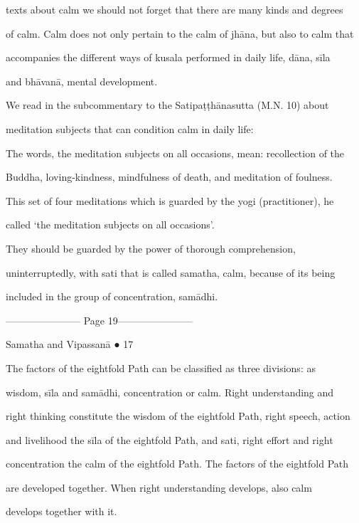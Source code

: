 texts about calm we should not forget that there are many kinds and degrees  

of calm. Calm does not only pertain to the calm of jhāna, but also to calm that  

accompanies  the  different ways  of  kusala  performed  in  daily  life,  dāna,  sīla  

and bhāvanā, mental development. 

   We  read  in  the  subcommentary  to  the  Satipaṭṭhānasutta  (M.N.  10)  about  

meditation subjects that can condition calm in daily life: 



      The words, the meditation subjects on all occasions, mean: recollection of the  

      Buddha, loving-kindness, mindfulness of death, and meditation of foulness. 

         This set of four meditations which is guarded by the yogi (practitioner), he  

      called ‘the meditation subjects on all occasions’. 

         They should be guarded by the power of thorough comprehension,  

      uninterruptedly, with sati that is called samatha, calm, because of its being  

      included in the group of concentration, samādhi. 


----------------------- Page 19-----------------------

                                                               Samatha and Vipassanā ● 17 



The   factors   of   the   eightfold   Path   can   be   classified   as   three   divisions:   as  

wisdom,   sīla  and  samādhi,  concentration  or  calm.  Right  understanding  and  

right thinking constitute the wisdom of the eightfold Path, right speech, action  

and  livelihood  the  sīla  of  the  eightfold  Path,  and  sati,  right  effort  and  right  

concentration the calm of the eightfold Path. The factors of the eightfold Path  

are   developed   together.   When   right   understanding   develops,   also   calm  

develops together with it. 

